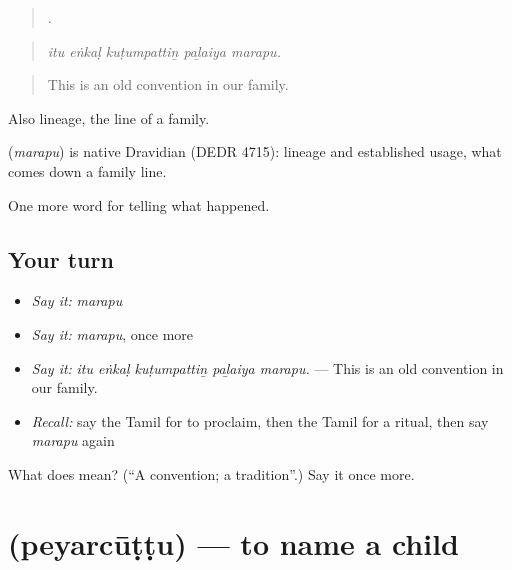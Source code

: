 \begin{quote}
    .
\end{quote}

\begin{quote}
\emph{itu eṅkaḷ kuṭumpattiṉ paḻaiya marapu.}
\end{quote}

\begin{quote}
This is an old convention in our family.
\end{quote}

Also lineage, the line of a family.

\begin{cousinweb}
\textbf{} (\emph{marapu}) is native Dravidian (DEDR 4715): lineage and established usage, what comes down a family line.
\end{cousinweb}

\begin{grammarlens}[title={What you've built}]
One more word for telling what happened.
\end{grammarlens}

\subsection*{Your turn}
\begin{itemize}
\raggedright
  \item \emph{Say it:} \emph{marapu}
  \item \emph{Say it:} \emph{marapu}, once more
  \item \emph{Say it:} \emph{itu eṅkaḷ kuṭumpattiṉ paḻaiya marapu.} — This is an old convention in our family.
  \item \emph{Recall:} say the Tamil for to proclaim, then the Tamil for a ritual, then say \emph{marapu} again
\end{itemize}

\begin{tcolorbox}[breakable,colback=teal!4,colframe=teal!35!black,title={Before you move on}]
What does  mean? (\textquotedblleft{}A convention; a tradition\textquotedblright{}.) Say it once more.
\end{tcolorbox}
\section[\texorpdfstring{\ta{பெயர்சூட்டு} (peyarcūṭṭu)}{பெயர்சூட்டு (peyarcūṭṭu)}]{ (peyarcūṭṭu) — to name a child}


